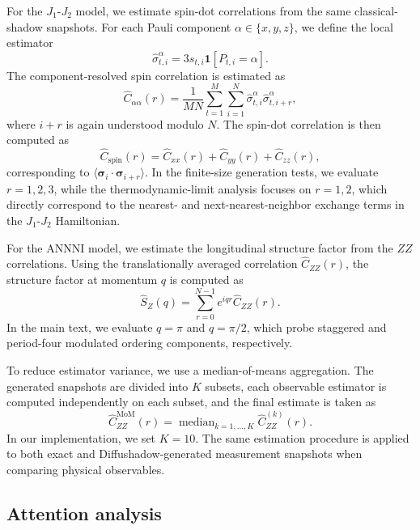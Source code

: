 \documentclass[pdflatex,sn-mathphys-num]{sn-jnl}%
\theoremstyle{thmstyleone}%
\theoremstyle{thmstyletwo}%
\theoremstyle{thmstylethree}%
\begin{document}
For the \(J_1\)-\(J_2\) model, we estimate spin-dot correlations from the same classical-shadow snapshots. For each Pauli component \(\alpha\in\{x,y,z\}\), we define the local estimator
\[
\widehat{\sigma}^{\alpha}_{t,i}
=
3s_{t,i}\mathbf{1}[P_{t,i}=\alpha].
\]
The component-resolved spin correlation is estimated as
\begin{equation}
\widehat{C}_{\alpha\alpha}(r)
=
\frac{1}{MN}
\sum_{t=1}^{M}
\sum_{i=1}^{N}
\widehat{\sigma}^{\alpha}_{t,i}
\widehat{\sigma}^{\alpha}_{t,i+r},
\end{equation}
where \(i+r\) is again understood modulo \(N\). The spin-dot correlation is then computed as
\begin{equation}
\widehat{C}_{\mathrm{spin}}(r)
=
\widehat{C}_{xx}(r)
+
\widehat{C}_{yy}(r)
+
\widehat{C}_{zz}(r),
\end{equation}
corresponding to
\(\langle\boldsymbol{\sigma}_i\cdot\boldsymbol{\sigma}_{i+r}\rangle\).
In the finite-size generation tests, we evaluate \(r=1,2,3\), while the thermodynamic-limit analysis focuses on \(r=1,2\), which directly correspond to the nearest- and next-nearest-neighbor exchange terms in the \(J_1\)-\(J_2\) Hamiltonian.

For the ANNNI model, we estimate the longitudinal structure factor from the \(ZZ\) correlations. Using the translationally averaged correlation \(\widehat{C}_{ZZ}(r)\), the structure factor at momentum \(q\) is computed as
\begin{equation}
\widehat{S}_{Z}(q)
=
\sum_{r=0}^{N-1}
e^{iqr}
\widehat{C}_{ZZ}(r).
\end{equation}
In the main text, we evaluate \(q=\pi\) and \(q=\pi/2\), which probe staggered and period-four modulated ordering components, respectively.



To reduce estimator variance, we use a median-of-means aggregation. The generated snapshots are divided into \(K\) subsets, each observable estimator is computed independently on each subset, and the final estimate is taken as
\begin{equation}
\widehat{C}^{\mathrm{MoM}}_{ZZ}(r)
=
\operatorname{median}_{k=1,\ldots,K}
\widehat{C}^{(k)}_{ZZ}(r).
\end{equation}
In our implementation, we set \(K=10\). The same estimation procedure is applied to both exact and Diffushadow-generated measurement snapshots when comparing physical observables.



\subsection{Attention analysis}
\label{sec:method_attention}
\end{document}
